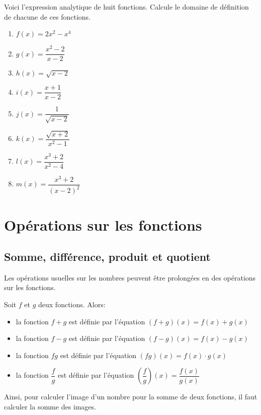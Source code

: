 \documentclass[a4paper,12pt]{report}
\begin{document}
\begin{exercice}
Voici l'expression analytique de huit fonctions. Calcule le domaine de
définition de chacune de ces fonctions.
\par \setlength{\columnseprule}{0 pt}
          \begin{minipage}[t]{\linewidth}
          \begin{multicols}{3}

\begin{enumerate}
\item \(f(x)=2x^2-x^4\)

\item \(g(x)=\dfrac{x^2-2}{x-2}\)

\item \(h(x)=\sqrt{x-2}\)

\item \(i(x)=\dfrac{x+1}{x-2}\)

\item \(j(x)=\dfrac{1}{\sqrt{x-2}}\)

\item \(k(x)=\dfrac{\sqrt{x+2}}{x^2-1}\)

\item \(l(x)=\dfrac{x^3+2}{x^2-4}\)

\item \(m(x)=\dfrac{x^3+2}{(x-2)^2}\)
\end{enumerate}


\end{multicols}\end{minipage}
\end{exercice}
\chapter{Opérations sur les fonctions}
\label{sec:org703fb48}
\section{Somme, différence, produit et quotient}
\label{sec:orgda1976b}
Les opérations usuelles sur les nombres peuvent être prolongées en des
opérations sur les fonctions.
\begin{definition}
Soit \(f\) et \(g\) deux fonctions. Alors:

\begin{itemize}
\item la fonction \(f+g\) est définie par l'équation \((f+g)(x)=f(x)+g(x)\)

\item la fonction \(f-g\) est définie par l'équation \((f-g)(x)=f(x)-g(x)\)

\item la fonction \(fg\) est définie par l'équation \((fg)(x)=f(x)\cdot g(x)\)

\item la fonction \(\dfrac{f}{g}\) est définie par l'équation \(\left(\dfrac{f}{g}\right)(x)=\dfrac{f(x)}{g(x)}\)
\end{itemize}
\end{definition}
Ainsi, pour calculer l'image d'un nombre pour la somme de deux fonctions, il
faut calculer la somme des images.
\end{document}
